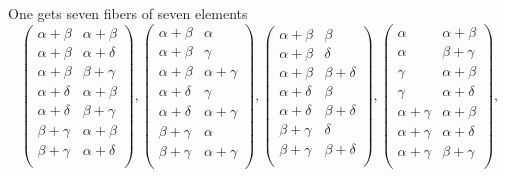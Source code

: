 \documentclass[12pt]{article}
\begin{document}
One gets seven fibers of seven elements
\bigskip
$$
\left(
\begin{array}{cc}
 \alpha +\beta  & \alpha +\beta  \\
 \alpha +\beta  & \alpha +\delta  \\
 \alpha +\beta  & \beta +\gamma  \\
 \alpha +\delta  & \alpha +\beta  \\
 \alpha +\delta  & \beta +\gamma  \\
 \beta +\gamma  & \alpha +\beta  \\
 \beta +\gamma  & \alpha +\delta  \\
\end{array}\right),
\left(
\begin{array}{cc}
 \alpha +\beta  & \alpha  \\
 \alpha +\beta  & \gamma  \\
 \alpha +\beta  & \alpha +\gamma  \\
 \alpha +\delta  & \gamma  \\
 \alpha +\delta  & \alpha +\gamma  \\
 \beta +\gamma  & \alpha  \\
 \beta +\gamma  & \alpha +\gamma  \\
\end{array}
\right),\left(
\begin{array}{cc}
 \alpha +\beta  & \beta  \\
 \alpha +\beta  & \delta  \\
 \alpha +\beta  & \beta +\delta  \\
 \alpha +\delta  & \beta  \\
 \alpha +\delta  & \beta +\delta  \\
 \beta +\gamma  & \delta  \\
 \beta +\gamma  & \beta +\delta  \\
\end{array}
\right),\left(
\begin{array}{cc}
 \alpha  & \alpha +\beta  \\
 \alpha  & \beta +\gamma  \\
 \gamma  & \alpha +\beta  \\
 \gamma  & \alpha +\delta  \\
 \alpha +\gamma  & \alpha +\beta  \\
 \alpha +\gamma  & \alpha +\delta  \\
 \alpha +\gamma  & \beta +\gamma  \\
\end{array}
\right),$$
\end{document}
